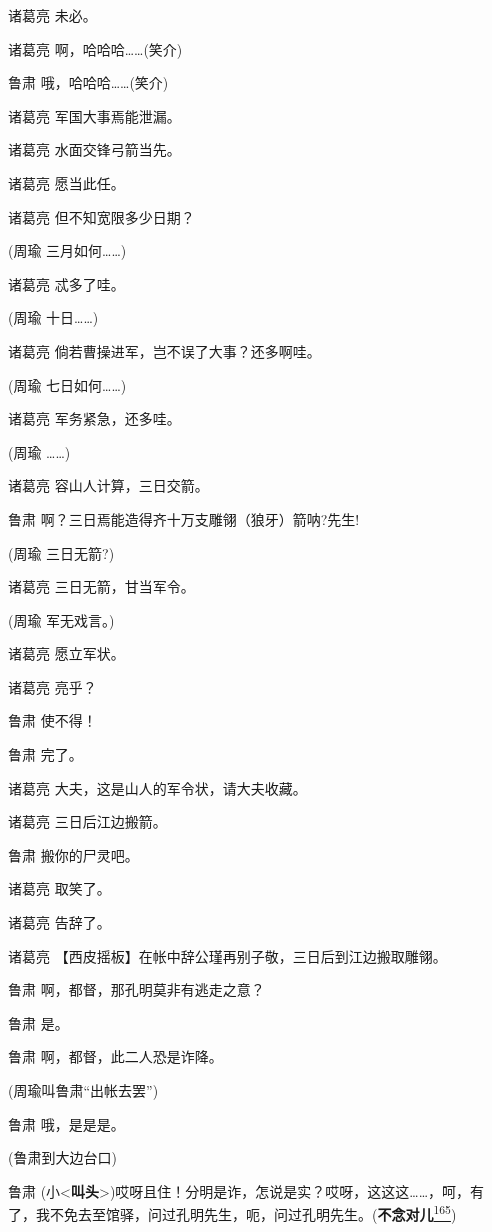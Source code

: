 诸葛亮 未必。

诸葛亮 啊，哈哈哈\ldots{}\ldots{}(笑介)

鲁肃 哦，哈哈哈\ldots{}\ldots{}(笑介)

诸葛亮 军国大事焉能泄漏。

诸葛亮 水面交锋弓箭当先。

诸葛亮 愿当此任。

诸葛亮 但不知宽限多少日期？

(周瑜 三月如何\ldots{}\ldots{})

诸葛亮 忒多了哇。

(周瑜 十日\ldots{}\ldots{})

诸葛亮 倘若曹操进军，岂不误了大事？还多啊哇。

(周瑜 七日如何\ldots{}\ldots{})

诸葛亮 军务紧急，还多哇。

(周瑜 \ldots{}\ldots{})

诸葛亮 容山人计算，三日交箭。

鲁肃 啊？三日焉能造得齐十万支雕翎（狼牙）箭呐?先生!

(周瑜 三日无箭?)

诸葛亮 三日无箭，甘当军令。

(周瑜 军无戏言。)

诸葛亮 愿立军状。

诸葛亮 亮乎？

鲁肃 使不得！

鲁肃 完了。

诸葛亮 大夫，这是山人的军令状，请大夫收藏。

诸葛亮 三日后江边搬箭。

鲁肃 搬你的尸灵吧。

诸葛亮 取笑了。

诸葛亮 告辞了。

诸葛亮 【西皮摇板】在帐中辞公瑾再别子敬，三日后到江边搬取雕翎。

鲁肃 啊，都督，那孔明莫非有逃走之意？

鲁肃 是。

鲁肃 啊，都督，此二人恐是诈降。

(周瑜叫鲁肃``出帐去罢'')

鲁肃 哦，是是是。

(鲁肃到大边台口)

鲁肃
(小\textless{}\textbf{叫头}\textgreater{})哎呀且住！分明是诈，怎说是实？哎呀，这这这\ldots{}\ldots{}，呵，有了，我不免去至馆驿，问过孔明先生，呃，问过孔明先生。(\textbf{不念对儿}\protect\hyperlink{fn165}{\textsuperscript{165}})

